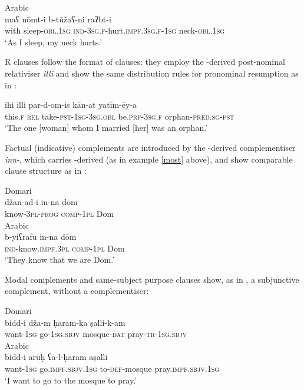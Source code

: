\documentclass[output=paper]{langsci/langscibook}
\begin{document}
\ex
{Arabic}\\
\gll maʕ nōmt-i b-tūžaʕ-ni raʔbt-i  \\
       with sleep-\textsc{obl.1sg} \textsc{ind-3sg.f}-hurt.\textsc{impf.3sg.f-1sg} neck-\textsc{obl.1sg}\\
\glt       ‘As I sleep, my neck hurts.’
\z
\z

R clauses follow the format of   clauses: they employ the -derived post-nominal relativiser \textit{illi} and show the same distribution rules for pronominal resumption as in :

\ea \gll   ihi illi par-d-om-is kān-at yatīm-ēy-a\\
       this.\textsc{f} \textsc{rel} take-\textsc{pst-1sg-3sg.obl} be.\textsc{prf-3sg.f} orphan-\textsc{pred.sg-pst}\\
\glt   ‘The one [woman] whom I married [her] was an orphan.’
\z

Factual (indicative) complements are introduced by the -derived complementiser \textit{inn-}, which carries -derived  (as in example \ref{most} above), and show comparable clause structure as in :

\ea
\ea
{Domari}\\
\gll džan-ad-i in-na dōm    \\
     know-\textsc{3pl-prog} \textsc{comp}-\textsc{1pl} Dom\\
\ex
{Arabic}\\
\gll b-yiʕrafu in-na dōm  \\
     \textsc{ind}-know.\textsc{impf.3pl} \textsc{comp}-\textsc{1pl} Dom\\
\glt ‘They know that we are Dom.’
\z
\z

Modal complements and same-subject purpose clauses show, as in , a subjunctive complement, without a complementiser:

\ea
\ea
{Domari}\\
\gll bidd-i  dža-m  ḥaram-ka ṣalli-k-am  \\
       want-\textsc{1sg} go-\textsc{1sg.sbjv} mosque-\textsc{dat} pray-\textsc{tr-1sg.sbjv}\\
\ex
{Arabic}\\
\gll bidd-i  arūḥ ʕa-l-ḥaram aṣalli  \\
       want-\textsc{1sg} go.\textsc{impf.sbjv.1sg} to-\textsc{def-}mosque pray.\textsc{impf.sbjv.1sg} \\
\glt    ‘I want to go to the mosque to pray.’
\z
\z
\end{document}
